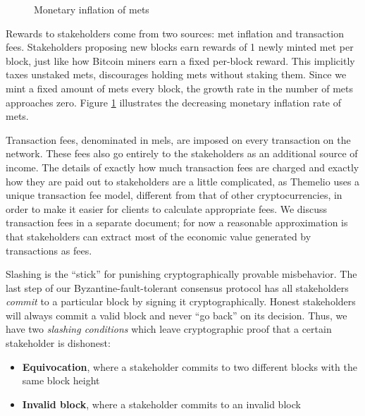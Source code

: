 \documentclass[headinclude]{scrbook}
\begin{document}
\begin{figure}
    \centering
    \caption{Monetary inflation of mets}
    \label{fig:metinflation}
\end{figure}

Rewards to stakeholders come from two sources: met inflation and transaction fees. Stakeholders proposing new blocks earn rewards of 1 newly minted met per block, just like how Bitcoin miners earn a fixed per-block reward. This implicitly taxes unstaked mets, discourages holding mets without staking them. Since we mint a fixed amount of mets every block, the growth rate in the number of mets approaches zero. Figure \ref{fig:metinflation} illustrates the decreasing monetary inflation rate of mets.

Transaction fees, denominated in mels, are imposed on every transaction on the network. These fees also go entirely to the stakeholders as an additional source of income. The details of exactly how much transaction fees are charged and exactly how they are paid out to stakeholders are a little complicated, as Themelio uses a unique transaction fee model, different from that of other cryptocurrencies, in order to make it easier for clients to calculate appropriate fees. We discuss transaction fees in a separate document; for now a reasonable approximation is that stakeholders can extract most of the economic value generated by transactions as fees.

Slashing is the ``stick'' for punishing cryptographically provable misbehavior. The last step of our Byzantine-fault-tolerant consensus protocol has all stakeholders \emph{commit} to a particular block by signing it cryptographically. Honest stakeholders will always commit a valid block and never ``go back'' on its decision. Thus, we have two \emph{slashing conditions} which leave cryptographic proof that a certain stakeholder is dishonest:

\begin{itemize}
    \item \textbf{Equivocation}, where a stakeholder commits to two different blocks with the same block height
    \item \textbf{Invalid block}, where a stakeholder commits to an invalid block
\end{itemize}
\end{document}
